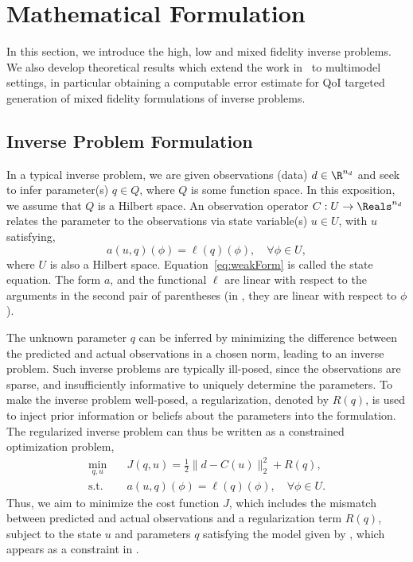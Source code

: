 \section{Mathematical Formulation}\label{sec:form}
%
In this section, we introduce the high, low and mixed fidelity inverse problems. We also develop theoretical results which extend the work in~\cite{BecVex05} to multimodel settings, in particular obtaining a computable error estimate for QoI targeted generation of mixed fidelity formulations of inverse problems.

\subsection{Inverse Problem Formulation}  \label{sec:setup}
%
In a typical inverse problem, we are given observations (data) $d\in\R^{n_d}$ and seek to infer parameter(s) $q\in Q$, where $Q$ is some function space. In this exposition, we assume that $Q$ is a Hilbert space. An observation operator $C:U\to\Reals^{n_d}$ relates the parameter to the observations via state variable(s) $u\in U$, with $u$ satisfying,
%
\begin{equation}
a(u,q)(\phi)=\ell(q)(\phi),\quad\forall\phi\in U,
\label{eq:weakForm}
\end{equation}
%
where $U$ is also a Hilbert space. Equation~\ref{eq:weakForm} is called the state equation. The form $a$, and the functional $\ell$ are linear with respect to the arguments in the second pair of parentheses (in , they are linear with respect to $\phi$).

The unknown parameter $q$ can be inferred by minimizing the difference between the predicted and actual observations in a chosen norm, leading to an inverse problem. Such inverse problems are typically ill-posed, since the observations are sparse, and insufficiently informative to uniquely determine the parameters. To make the inverse problem well-posed, a regularization, denoted by $R(q)$, is used to inject prior information or beliefs about the parameters into the formulation. The regularized inverse problem can thus be written as a constrained optimization problem,
%
\begin{subequations}
\label{eq:invOpt}
\begin{align}
\min\limits_{q,u} & \quad J(q,u)=\frac{1}{2}\|d-C(u)\|_2^2 + R(q), \label{eq:invOpt_obj} \\
\textrm{s.t. }& \quad a(u,q)(\phi)=\ell(q)(\phi),\quad\forall\phi\in U. \label{eq:invOpt_cons}
\end{align}
\end{subequations}
%
Thus, we aim to minimize the cost function $J$, which includes the mismatch between predicted and actual observations and a regularization term $R(q)$, subject to the state $u$ and parameters $q$ satisfying the model given by , which appears as a constraint in .

